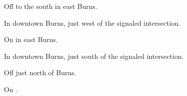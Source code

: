 

\begin{LocationList}

Off  to the south in east Burns.

In downtown Burns, just west of the signaled intersection.

On  in east Burns.

In downtown Burns, just south of the signaled intersection.

Off  just north of Burns.

\Location{\TruckStop \Gas \Rest \Service \Weigh}
On  .

\end{LocationList}
